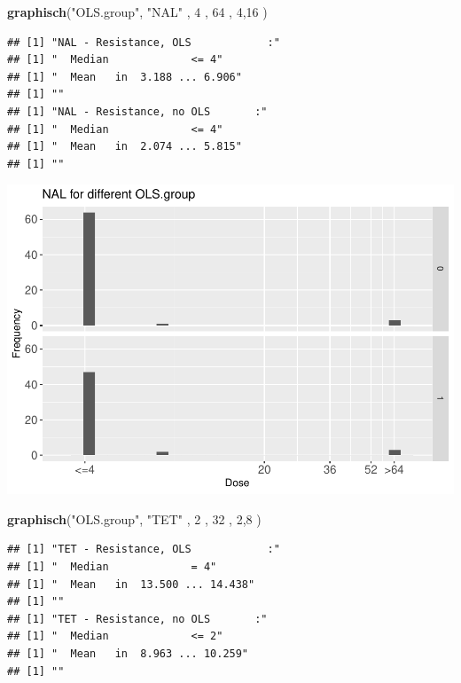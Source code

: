 \documentclass[
]{article}
\newenvironment{Shaded}{\begin{snugshade}}{\end{snugshade}}
\newcommand{\DecValTok}[1]{\textcolor[rgb]{0.00,0.00,0.81}{#1}}
\newcommand{\KeywordTok}[1]{\textcolor[rgb]{0.13,0.29,0.53}{\textbf{#1}}}
\newcommand{\NormalTok}[1]{#1}
\newcommand{\StringTok}[1]{\textcolor[rgb]{0.31,0.60,0.02}{#1}}
\begin{document}
\begin{Shaded}
\begin{Highlighting}[]
  \KeywordTok{graphisch}\NormalTok{(}\StringTok{"OLS.group"}\NormalTok{, }\StringTok{"NAL"}\NormalTok{ , }\DecValTok{4}\NormalTok{    ,  }\DecValTok{64}\NormalTok{   ,   }\DecValTok{4}\NormalTok{,}\DecValTok{16}\NormalTok{    ) }
\end{Highlighting}
\end{Shaded}

\begin{verbatim}
## [1] "NAL - Resistance, OLS            :"
## [1] "  Median             <= 4"
## [1] "  Mean   in  3.188 ... 6.906"
## [1] ""
## [1] "NAL - Resistance, no OLS       :"
## [1] "  Median             <= 4"
## [1] "  Mean   in  2.074 ... 5.815"
## [1] ""
\end{verbatim}

\includegraphics{Verteilungen_files/figure-latex/unnamed-chunk-27-1.pdf}

\begin{Shaded}
\begin{Highlighting}[]
  \KeywordTok{graphisch}\NormalTok{(}\StringTok{"OLS.group"}\NormalTok{, }\StringTok{"TET"}\NormalTok{ , }\DecValTok{2}\NormalTok{    ,  }\DecValTok{32}\NormalTok{   ,   }\DecValTok{2}\NormalTok{,}\DecValTok{8}\NormalTok{    ) }
\end{Highlighting}
\end{Shaded}

\begin{verbatim}
## [1] "TET - Resistance, OLS            :"
## [1] "  Median             = 4"
## [1] "  Mean   in  13.500 ... 14.438"
## [1] ""
## [1] "TET - Resistance, no OLS       :"
## [1] "  Median             <= 2"
## [1] "  Mean   in  8.963 ... 10.259"
## [1] ""
\end{verbatim}
\end{document}
